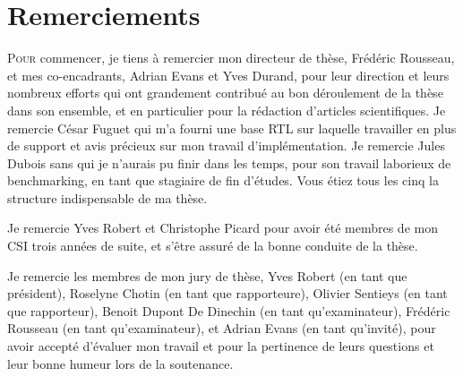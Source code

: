 
\FancyHeadRight{\sectitle}

\renewcommand{\sectitle}{Remerciements}

\addcontentsline{toc}{chapter}{\sectitle}
\chapter*{\sectitle}


\lettrine{P}{our} commencer, je tiens à remercier mon directeur de thèse, Frédéric Rousseau, et mes co-encadrants, Adrian Evans et Yves Durand, pour leur direction et leurs nombreux efforts qui ont grandement contribué au bon déroulement de la thèse dans son ensemble, et en particulier pour la rédaction d'articles scientifiques.
Je remercie César Fuguet qui m'a fourni une base RTL sur laquelle travailler en plus de support et avis précieux sur mon travail d'implémentation.
Je remercie Jules Dubois sans qui je n'aurais pu finir dans les temps, pour son travail laborieux de benchmarking, en tant que stagiaire de fin d'études.
Vous étiez tous les cinq la structure indispensable de ma thèse.

Je remercie Yves Robert et Christophe Picard pour avoir été membres de mon CSI trois années de suite, et s'être assuré de la bonne conduite de la thèse.

Je remercie les membres de mon jury de thèse, Yves Robert (en tant que président), Roselyne Chotin (en tant que rapporteure), Olivier Sentieys (en tant que rapporteur), Benoit Dupont De Dinechin (en tant qu'examinateur), Frédéric Rousseau (en tant qu'examinateur), et Adrian Evans (en tant qu'invité), pour avoir accepté d'évaluer mon travail et pour la pertinence de leurs questions et leur bonne humeur lors de la soutenance.

\bigskip

